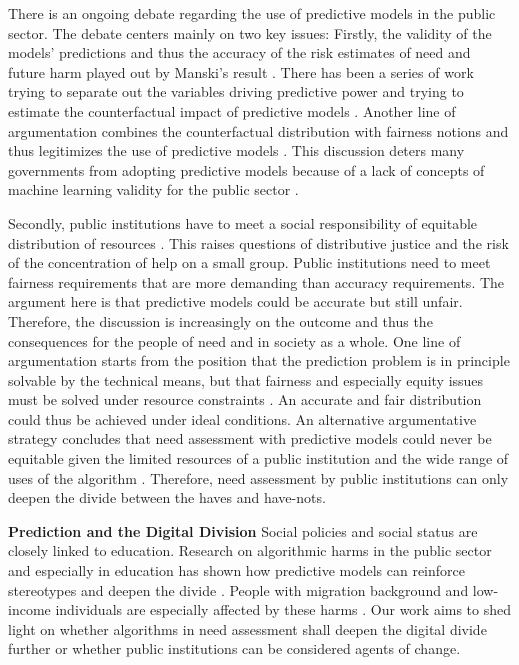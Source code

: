 There is an ongoing debate regarding the use of predictive models in the public sector. The debate centers mainly on two key issues: Firstly, the validity of the models' predictions and thus the accuracy of the risk estimates of need and future harm played out by Manski's result \cite{Manski2004}. There has been a series of work trying to separate out the variables driving predictive power and trying to estimate the counterfactual impact of predictive models \cite{Bach_Kern_Mautner_Kreuter_2023, chouldechova2018case, elmachtoub2022smart, jain2024position, shirali2024}. Another line of argumentation combines the counterfactual distribution with fairness notions and thus legitimizes the use of predictive models \cite{coston2023sat,Guerdan23,wang2024}. This discussion deters many governments from adopting predictive models because of a lack of concepts of machine learning validity for the public sector \cite{Bach_Kern_Mautner_Kreuter_2023}.

Secondly, public institutions have to meet a social responsibility of equitable distribution of resources \cite{kleinberg2015prediction}. This raises questions of distributive justice and the risk of the concentration of help on a small group. Public institutions need to meet fairness requirements that are more demanding than accuracy requirements. The argument here is that predictive models could be accurate but still unfair. Therefore, the discussion is increasingly on the outcome and thus the consequences for the people of need and in society as a whole. One line of argumentation starts from the position that the prediction problem is in principle solvable by the technical means, but that fairness and especially equity issues must be solved under resource constraints \cite{loriprovist2022,pmlr-v235-perdomo24a, wilder2024learning}. An accurate and fair distribution could thus be achieved under ideal conditions. An alternative argumentative strategy concludes that need assessment with predictive models could never be equitable given the limited resources of a public institution and the wide range of uses of the algorithm \cite{simone2022}. Therefore, need assessment by public institutions can only deepen the divide between the haves and have-nots.

\textbf{Prediction and the Digital Division}
Social policies and social status are closely linked to education. Research on algorithmic harms in the public sector and especially in education has shown how predictive models can reinforce stereotypes and deepen the divide \cite{chouldechova2018case}. People with migration background and low-income individuals are especially affected by these harms \cite{desireUsingArtificialIntelligence2021,perdomo2023difficult}. Our work aims to shed light on whether algorithms in need assessment shall deepen the digital divide further or whether public institutions can be considered agents of change.

